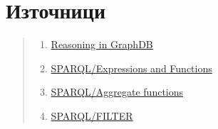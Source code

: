\documentclass[12pt]{article}
\begin{document}
    




\listoffigures

\section{Източници}

\begin{quote}

    \begin{enumerate}
    
    \item \href{https://graphdb.ontotext.com/documentation/10.2/reasoning.html}{Reasoning in GraphDB}

    \item \href{https://en.wikibooks.org/wiki/SPARQL/Expressions_and_Functions}{SPARQL/Expressions and Functions}

    \item \href{https://en.wikibooks.org/wiki/SPARQL/Aggregate_functions}{SPARQL/Aggregate functions}

    \item \href{https://en.wikibooks.org/wiki/SPARQL/FILTER}{SPARQL/FILTER}
        
    \end{enumerate}

\end{quote}
\end{document}
